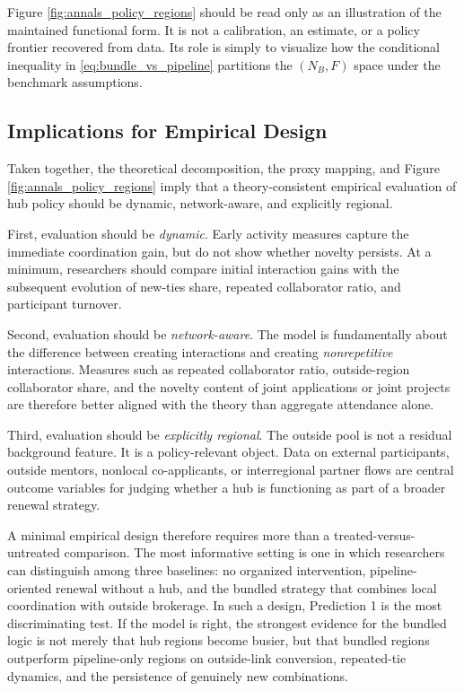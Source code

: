 Figure \ref{fig:annals_policy_regions} should be read only as an illustration of the maintained functional form. It is not a calibration, an estimate, or a policy frontier recovered from data. Its role is simply to visualize how the conditional inequality in \eqref{eq:bundle_vs_pipeline} partitions the $(N_B,F)$ space under the benchmark assumptions.

\subsection{Implications for Empirical Design}

Taken together, the theoretical decomposition, the proxy mapping, and Figure \ref{fig:annals_policy_regions} imply that a theory-consistent empirical evaluation of hub policy should be dynamic, network-aware, and explicitly regional.

First, evaluation should be \emph{dynamic}. Early activity measures capture the immediate coordination gain, but do not show whether novelty persists. At a minimum, researchers should compare initial interaction gains with the subsequent evolution of new-ties share, repeated collaborator ratio, and participant turnover.

Second, evaluation should be \emph{network-aware}. The model is fundamentally about the difference between creating interactions and creating \emph{nonrepetitive} interactions. Measures such as repeated collaborator ratio, outside-region collaborator share, and the novelty content of joint applications or joint projects are therefore better aligned with the theory than aggregate attendance alone.

Third, evaluation should be \emph{explicitly regional}. The outside pool is not a residual background feature. It is a policy-relevant object. Data on external participants, outside mentors, nonlocal co-applicants, or interregional partner flows are central outcome variables for judging whether a hub is functioning as part of a broader renewal strategy.

A minimal empirical design therefore requires more than a treated-versus-untreated comparison. The most informative setting is one in which researchers can distinguish among three baselines: no organized intervention, pipeline-oriented renewal without a hub, and the bundled strategy that combines local coordination with outside brokerage. In such a design, Prediction 1 is the most discriminating test. If the model is right, the strongest evidence for the bundled logic is not merely that hub regions become busier, but that bundled regions outperform pipeline-only regions on outside-link conversion, repeated-tie dynamics, and the persistence of genuinely new combinations.

